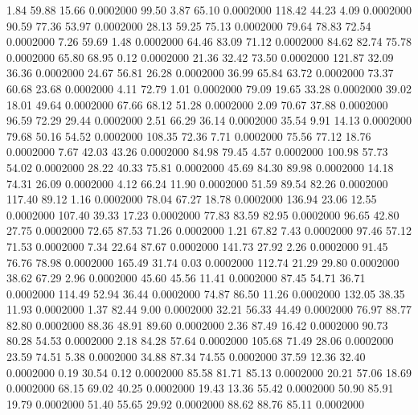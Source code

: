    1.84   59.88   15.66   0.0002000
  99.50    3.87   65.10   0.0002000
 118.42   44.23    4.09   0.0002000
  90.59   77.36   53.97   0.0002000
  28.13   59.25   75.13   0.0002000
  79.64   78.83   72.54   0.0002000
   7.26   59.69    1.48   0.0002000
  64.46   83.09   71.12   0.0002000
  84.62   82.74   75.78   0.0002000
  65.80   68.95    0.12   0.0002000
  21.36   32.42   73.50   0.0002000
 121.87   32.09   36.36   0.0002000
  24.67   56.81   26.28   0.0002000
  36.99   65.84   63.72   0.0002000
  73.37   60.68   23.68   0.0002000
   4.11   72.79    1.01   0.0002000
  79.09   19.65   33.28   0.0002000
  39.02   18.01   49.64   0.0002000
  67.66   68.12   51.28   0.0002000
   2.09   70.67   37.88   0.0002000
  96.59   72.29   29.44   0.0002000
   2.51   66.29   36.14   0.0002000
  35.54    9.91   14.13   0.0002000
  79.68   50.16   54.52   0.0002000
 108.35   72.36    7.71   0.0002000
  75.56   77.12   18.76   0.0002000
   7.67   42.03   43.26   0.0002000
  84.98   79.45    4.57   0.0002000
 100.98   57.73   54.02   0.0002000
  28.22   40.33   75.81   0.0002000
  45.69   84.30   89.98   0.0002000
  14.18   74.31   26.09   0.0002000
   4.12   66.24   11.90   0.0002000
  51.59   89.54   82.26   0.0002000
 117.40   89.12    1.16   0.0002000
  78.04   67.27   18.78   0.0002000
 136.94   23.06   12.55   0.0002000
 107.40   39.33   17.23   0.0002000
  77.83   83.59   82.95   0.0002000
  96.65   42.80   27.75   0.0002000
  72.65   87.53   71.26   0.0002000
   1.21   67.82    7.43   0.0002000
  97.46   57.12   71.53   0.0002000
   7.34   22.64   87.67   0.0002000
 141.73   27.92    2.26   0.0002000
  91.45   76.76   78.98   0.0002000
 165.49   31.74    0.03   0.0002000
 112.74   21.29   29.80   0.0002000
  38.62   67.29    2.96   0.0002000
  45.60   45.56   11.41   0.0002000
  87.45   54.71   36.71   0.0002000
 114.49   52.94   36.44   0.0002000
  74.87   86.50   11.26   0.0002000
 132.05   38.35   11.93   0.0002000
   1.37   82.44    9.00   0.0002000
  32.21   56.33   44.49   0.0002000
  76.97   88.77   82.80   0.0002000
  88.36   48.91   89.60   0.0002000
   2.36   87.49   16.42   0.0002000
  90.73   80.28   54.53   0.0002000
   2.18   84.28   57.64   0.0002000
 105.68   71.49   28.06   0.0002000
  23.59   74.51    5.38   0.0002000
  34.88   87.34   74.55   0.0002000
  37.59   12.36   32.40   0.0002000
   0.19   30.54    0.12   0.0002000
  85.58   81.71   85.13   0.0002000
  20.21   57.06   18.69   0.0002000
  68.15   69.02   40.25   0.0002000
  19.43   13.36   55.42   0.0002000
  50.90   85.91   19.79   0.0002000
  51.40   55.65   29.92   0.0002000
  88.62   88.76   85.11   0.0002000
